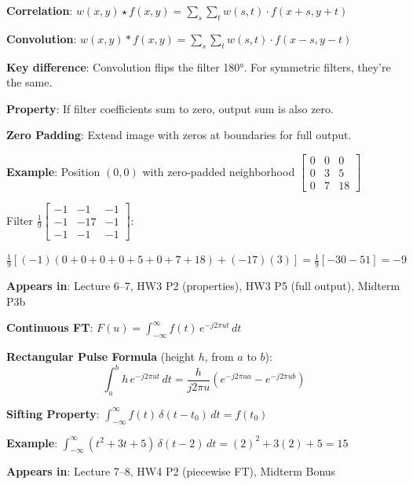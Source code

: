 \documentclass[10pt]{article}
\begin{document}
\begin{conceptbox}

\begin{formulabox}
\textbf{Correlation}: $w(x,y) \star f(x,y) = \sum_s \sum_t w(s,t) \cdot f(x+s, y+t)$

\textbf{Convolution}: $w(x,y) * f(x,y) = \sum_s \sum_t w(s,t) \cdot f(x-s, y-t)$

\textbf{Key difference}: Convolution flips the filter 180°. For symmetric filters, they're the same.

\textbf{Property}: If filter coefficients sum to zero, output sum is also zero.

\textbf{Zero Padding}: Extend image with zeros at boundaries for full output.
\end{formulabox}

\begin{examplebox}
\textbf{Example}: Position $(0,0)$ with zero-padded neighborhood $\begin{bmatrix} 0 & 0 & 0 \\ 0 & 3 & 5 \\ 0 & 7 & 18 \end{bmatrix}$

Filter $\frac{1}{9}\begin{bmatrix} -1 & -1 & -1 \\ -1 & -17 & -1 \\ -1 & -1 & -1 \end{bmatrix}$:

$\frac{1}{9}[(-1)(0+0+0+0+5+0+7+18) + (-17)(3)] = \frac{1}{9}[-30-51] = -9$
\end{examplebox}

\textbf{Appears in}: Lecture 6--7, HW3 P2 (properties), HW3 P5 (full output), Midterm P3b

\end{conceptbox}


\begin{conceptbox}

\begin{formulabox}
\textbf{Continuous FT}: $F(u) = \int_{-\infty}^{\infty} f(t)\, e^{-j2\pi ut}\,dt$

\textbf{Rectangular Pulse Formula} (height $h$, from $a$ to $b$):
\[
\boxed{\int_a^b h\, e^{-j2\pi ut}\,dt = \frac{h}{j2\pi u}\left(e^{-j2\pi ua} - e^{-j2\pi ub}\right)}
\]

\textbf{Sifting Property}: $\int_{-\infty}^{\infty} f(t)\,\delta(t-t_0)\,dt = f(t_0)$
\end{formulabox}

\begin{examplebox}
\textbf{Example}: $\int_{-\infty}^{\infty} (t^2 + 3t + 5)\,\delta(t-2)\,dt = (2)^2 + 3(2) + 5 = 15$
\end{examplebox}

\textbf{Appears in}: Lecture 7--8, HW4 P2 (piecewise FT), Midterm Bonus

\end{conceptbox}
\end{document}
